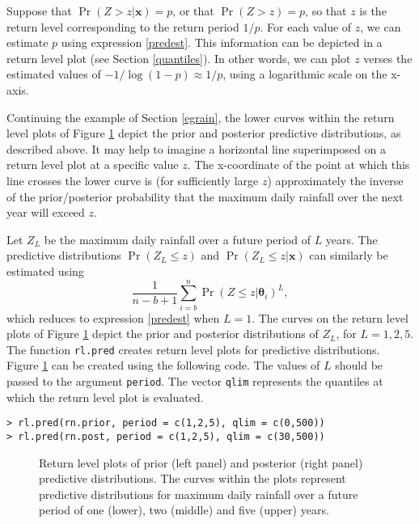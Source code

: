 \documentclass[11pt,a4paper]{article}
\newcommand{\bs}{\boldsymbol}
\begin{document}
Suppose that $\Pr(Z > z | \bs{x}) = p$, or that $\Pr(Z > z) = p$, so that $z$ is the return level corresponding to the return period $1/p$.
For each value of $z$, we can estimate $p$ using expression \eqref{predest}.
This information can be depicted in a return level plot (see Section \ref{quantiles}).
In other words, we can plot $z$ verses the estimated values of $-1/\log(1-p) \approx 1/p$, using a logarithmic scale on the x-axis.

Continuing the example of Section \ref{egrain}, the lower curves within the return level plots of Figure \ref{predrain} depict the prior and posterior predictive distributions, as described above.
It may help to imagine a horizontal line superimposed on a return level plot at a specific value $z$.
The x-coordinate of the point at which this line crosses the lower curve is (for sufficiently large $z$) approximately the inverse of the prior/posterior probability that the maximum daily rainfall over the next year will exceed $z$.

Let $Z_L$ be the maximum daily rainfall over a future period of $L$ years.
The predictive distributions $\Pr(Z_L \leq z)$ and $\Pr(Z_L \leq z | \bs{x})$ can similarly be estimated using 
\begin{equation*}
\frac{1}{n-b+1} \sum_{i=b}^{n} \Pr(Z \leq z | \bs{\theta}_i)^L,
\end{equation*}
which reduces to expression \eqref{predest} when $L=1$.
The curves on the return level plots of Figure \ref{predrain} depict the prior and posterior distributions of $Z_L$, for $L=1,2,5$.
The function \verb+rl.pred+ creates return level plots for predictive distributions.
Figure \ref{predrain} can be created using the following code.
The values of $L$ should be passed to the argument \verb+period+.
The vector \verb+qlim+ represents the quantiles at which the return level plot is evaluated.


\begin{verbatim}
> rl.pred(rn.prior, period = c(1,2,5), qlim = c(0,500))
> rl.pred(rn.post, period = c(1,2,5), qlim = c(30,500))
\end{verbatim}

\begin{figure}
\begin{center}
\vspace{-1.5cm}
\hspace{0cm}
\end{center}
\caption{Return level plots of prior (left panel) and posterior (right panel) predictive distributions. The curves within the plots represent predictive distributions for maximum daily rainfall over a future period of one (lower), two (middle) and five (upper) years.}
\label{predrain}
\end{figure}
\end{document}
